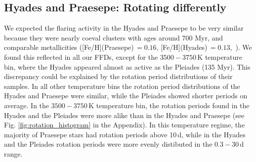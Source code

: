 \documentclass{aa}
\begin{document}
\subsection{Hyades and Praesepe: Rotating differently}
We expected the flaring activity in the Hyades and Praesepe to be very similar because they were nearly coeval clusters with ages around 700 Myr, and comparable metallicities ([Fe/H](Praesepe)\,$=0.16$, [Fe/H](Hyades)\,$=0.13$,~\citealt{netopil_metallicities_2016}). We found this reflected in all our FFDs, except for the $3500-3750$\,K temperature bin, where the Hyades appeared almost as active as the Pleiades (135 Myr). This discrepancy could be explained by the rotation period distributions of their samples. In all other temperature bins the rotation period distributions of the Hyades and Praesepe were similar, while the Pleiades showed shorter periods on average. In the $3500-3750$\,K temperature bin, the rotation periods found in the Hyades and the Pleiades were more alike than in the Hyades and Praesepe (see Fig. \ref{fig:rotation_histogram} in the Appendix). In this temperature regime, the majority of Praesepe stars had rotation periods above 10\,d, while in the Hyades and the Pleiades rotation periods were more evenly distibuted in the $0.3-30$\,d range.
\end{document}
